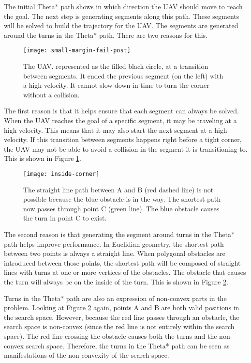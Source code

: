 The initial Theta* path shows in which direction the UAV should move to reach the goal. The next step is generating segments along this path. These segments will be solved to build the trajectory for the UAV. The segments are generated around the turns in the Theta* path. There are two reasons for this.
\par
\begin{figure}
\centering
\texttt{[image: small-margin-fail-post]}
\caption[An example of the UAV going too fast to execute a turn]{The  UAV, represented as the filled black circle, at a transition between segments. It ended the previous segment (on the left) with a high velocity. It cannot slow down in time to turn the corner without a collision.}
\label{fig:turn-fail}
\end{figure}
The first reason is that it helps ensure that each segment can always be solved. When the UAV reaches the goal of a specific segment, it may be traveling at a high velocity. This means that it may also start the next segment at a high velocity. If this transition between segments happens right before a tight corner, the UAV may not be able to avoid a collision in the segment it is transitioning to. This is shown in Figure \ref{fig:turn-fail}.
\par
\begin{figure}
\centering
\texttt{[image: inside-corner]}
\caption[A demonstration of how obstacles cause turns]{The straight line path between A and B (red dashed line) is not possible because the blue obstacle is in the way. The shortest path now passes through point C (green line). The blue obstacle causes the turn in point C to exist.}
\label{fig:inside-corner}
\end{figure}
The second reason is that generating the segment around turns in the Theta* path helps improve performance. In Euclidian geometry, the shortest path between two points is always a straight line. When polygonal obstacles are introduced between those points, the shortest path will be composed of straight lines with turns at one or more vertices of the obstacles. The obstacle that causes the turn will always be on the inside of the turn. This is shown in Figure \ref{fig:inside-corner}.
\par
Turns in the Theta* path are also an expression of non-convex parts in the problem. Looking at Figure \ref{fig:inside-corner} again, points A and B are both valid positions in the search space. However, because the red line passes through an obstacle, the search space is non-convex (since the red line is not entirely within the search space). The red line crossing the obstacle causes both the turns and the non-convex search space. Therefore, the turns in the Theta* path can be seen as manifestations of the non-convexity of the search space.
